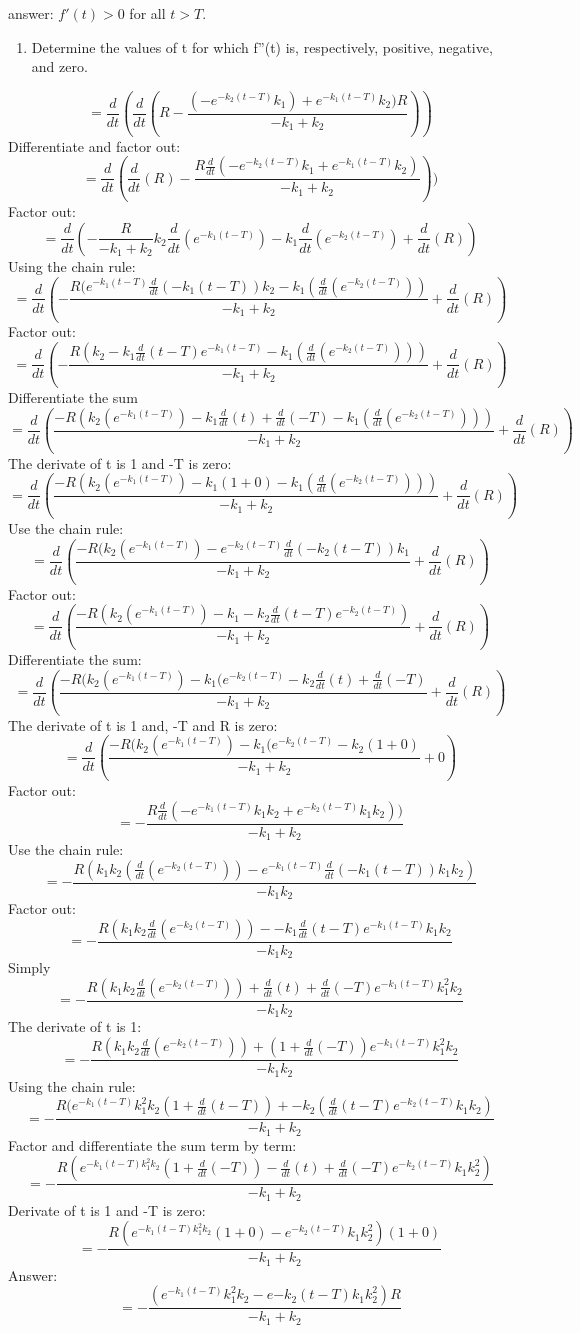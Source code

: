 \documentclass[]{article}
\providecommand{\tightlist}{%
  \setlength{\itemsep}{0pt}\setlength{\parskip}{0pt}}
\begin{document}
answer: \(f'(t) > 0\) for all \(t > T\).

\begin{enumerate}
\def\labelenumi{(\alph{enumi})}
\setcounter{enumi}{1}
\tightlist
\item
  Determine the values of t for which f''(t) is, respectively, positive,
  negative, and zero.
\end{enumerate}

\[=\frac{d}{dt}(\frac{d}{dt}(R - \frac{(-e^{-k_2(t-T)}k_1) + e^{-k_1(t-T)}k_2)R}{-k_1+k_2}))\]
Differentiate and factor out:
\[=\frac{d}{dt}(\frac{d}{dt}(R) - \frac{R \frac{d}{dt}(-e^{-k_2(t-T)}k_1 + e^{-k_1(t-T)}k_2)}{-k_1+k_2}))\]
Factor out:
\[=\frac{d}{dt}(-\frac{R}{-k_1 + k_2}k_2\frac{d}{dt}(e^{-k_1(t-T)})-k_1\frac{d}{dt}(e^{-k_2(t-T)})+\frac{d}{dt}(R))\]
Using the chain rule:
\[=\frac{d}{dt}(-\frac{R(e^{-k_1(t-T)}\frac{d}{dt}(-k_1(t-T))k_2 - k_1(\frac{d}{dt}(e^{-k_2(t-T)}))}{-k_1 +k_2}+\frac{d}{dt}(R))\]
Factor out:
\[= \frac{d}{dt}(-\frac{R(k_2-k_1 \frac{d}{dt}(t-T)e^{-k_1(t-T)}-k_1( \frac{d}{dt}(e^{-k_2(t-T)})))}{-k_1+k_2} + \frac{d}{dt}(R))\]
Differentiate the sum
\[=\frac{d}{dt}(\frac{-R(k_2(e^{-k_1(t-T)})-k_1\frac{d}{dt}(t)+\frac{d}{dt}(-T)-k_1(\frac{d}{dt}(e^{-k_2(t-T)})))}{-k_1+k_2}+\frac{d}{dt}(R))\]
The derivate of t is 1 and -T is zero:
\[=\frac{d}{dt}(\frac{-R(k_2(e^{-k_1(t-T)})-k_1(1+0)-k_1(\frac{d}{dt}(e^{-k_2(t-T)})))}{-k_1+k_2}+\frac{d}{dt}(R))\]
Use the chain rule:
\[=\frac{d}{dt}(\frac{-R(k_2(e^{-k_1(t-T)})-e^{-k_2(t-T)}\frac{d}{dt}(-k_2(t-T))k_1 }{-k_1+k_2}+\frac{d}{dt}(R))\]
Factor out:
\[=\frac{d}{dt}(\frac{-R(k_2(e^{-k_1(t-T)})-k_1-k_2\frac{d}{dt}(t-T)e^{-k_2(t-T)})  }{-k_1+k_2}+\frac{d}{dt}(R))\]
Differentiate the sum:
\[=\frac{d}{dt}(\frac{-R(k_2(e^{-k_1(t-T)})-k_1(e^{-k_2(t-T)}-k_2\frac{d}{dt}(t)+\frac{d}{dt}(-T)}{-k_1+k_2}+\frac{d}{dt}(R))\]
The derivate of t is 1 and, -T and R is zero:
\[=\frac{d}{dt}(\frac{-R(k_2(e^{-k_1(t-T)})-k_1(e^{-k_2(t-T)}-k_2(1+0)}{-k_1+k_2}+0)\]
Factor out:
\[=-\frac{R\frac{d}{dt}(-e^{-k_1(t-T)}k_1 k_2 + e^{-k_2(t-T)}k_1 k_2))}{-k_1 + k_2}\]
Use the chain rule:
\[=-\frac{R(k_1 k_2(\frac{d}{dt}(e^{-k_2(t-T)}))-e^{-k_1(t-T)}\frac{d}{dt}(-k_1(t-T))k_1 k_2)}{-k_1 k_2}\]
Factor out:
\[=-\frac{R(k_1 k_2 \frac{d}{dt}(e^{-k_2(t-T)}))--k_1\frac{d}{dt}(t-T)e^{-k_1(t-T)}k_1 k_2}{-k_1 k_2}\]
Simply
\[=-\frac{R(k_1 k_2 \frac{d}{dt}(e^{-k_2(t-T)}))+\frac{d}{dt}(t)+\frac{d}{dt}(-T)e^{-k_1(t-T)}k_1^2 k_2}{-k_1 k_2}\]
The derivate of t is 1:
\[=-\frac{R(k_1 k_2 \frac{d}{dt}(e^{-k_2(t-T)}))+(1+\frac{d}{dt}(-T))e^{-k_1(t-T)}k_1^2 k_2}{-k_1 k_2}\]
Using the chain rule:
\[=-\frac{R(e^{-k_1(t-T)}k_1^2k_2(1+\frac{d}{dt}(t-T))+-k_2(\frac{d}{dt}(t-T)e^{-k_2(t-T)}k_1 k_2)}{-k_1 + k_2}\]
Factor and differentiate the sum term by term:
\[=-\frac{R(e^{-k_1(t-T)k_1^2k_2}(1+\frac{d}{dt}(-T))- \frac{d}{dt}(t)+\frac{d}{dt}(-T)e^{-k_2(t-T)}k_1 k_2^2)}{-k_1 + k_2}\]
Derivate of t is 1 and -T is zero:
\[=-\frac{R(e^{-k_1(t-T)k_1^2k_2}(1+0)-e^{-k_2(t-T)}k_1 k_2^2)(1+0)}{-k_1 + k_2}\]
Answer:
\[=-\frac{(e^{-k_1 (t-T)}k_1^2 k_2 -e{-k_2(t-T)}k_1 k_2^2)R}{-k_1 + k_2}\]
\end{document}
